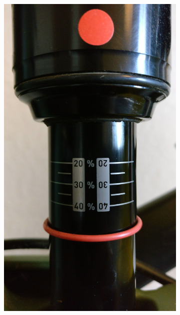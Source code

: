 			\begin{figure}[h!]
				\begin{subfigure}[t]{0.5\textwidth}
					\centering
					\includegraphics[scale=0.04]{../images/results/100_rs.jpg}
				\end{subfigure}
				\begin{subfigure}[t]{0.5\textwidth}
					\centering

\end{subfigure}
\end{figure}
